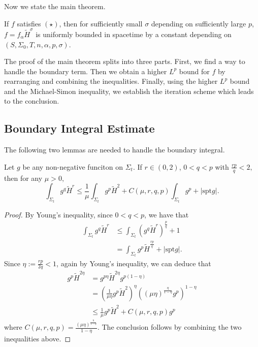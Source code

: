 Now we state the main theorem.

\begin{theorem} \label{stamit}
    If $f$ satisfies $(\star)$, then for sufficiently small $\sigma $ depending on sufficiently large $p$, $f=f_{\alpha }\tilde{H}^{\sigma }$ is uniformly bounded in spacetime by a constant depending on $(S,\Sigma _0,T,n,\alpha ,p,\sigma )$. 
\end{theorem}

The proof of the main theorem splits into three parts. First, we find a way to handle the boundary term. Then we obtain a higher $L^p$ bound for $f$ by rearranging and combining the inequalities. Finally, using the higher $L^p$ bound and the Michael-Simon inequality, we establish the iteration scheme which leads to the conclusion.

\subsection{Boundary Integral Estimate}

The following two lemmas are needed to handle the boundary integral.

\begin{lemma}\label{HSquare}
    Let $g$ be any non-negative funciton on $\Sigma_t.$ If $r \in (0,2)$, $0<q<p$ with $\frac{rp }{q}<2,$ then for any $\mu >0,$ 
    \[
        \int_{\Sigma_t} g^q \tilde{H}^r \leq \frac{1}{\mu }\int_{\Sigma_t} g^p \tilde{H}^2+C(\mu ,r,q,p )\int_{\Sigma_t} g^p + \left| \mathrm{spt } g \right|.    
    \]
\end{lemma}
\begin{proof}
    By Young's inequality, since $0<q<p$, we have that 
    \begin{equation*}
    \begin{split}
        \int_{\Sigma_t} g^q \tilde{H}^r 
    &\leq \int_{\Sigma_t} (g^q \tilde{H}^r)^{\frac{p}{q}}+1  \\
    &= \int_{\Sigma_t} g^p \tilde{H}^{\frac{rp }{q}}+\left| \mathrm{spt } g \right|.
    \end{split}
    \end{equation*} 
    Since $\eta := \frac{rp }{2q}<1$, again by Young's inequality, we can deduce that
    \begin{equation*}
    \begin{split}
        g^p \tilde{H}^{2\eta} 
    &= g^{p \eta }\tilde{H}^{2\eta}g^{p \left( 1-\eta \right) } \\
    &= \left( \frac{1}{\mu \eta  }g^{p}\tilde{H}^2 \right) ^{\eta} \left( (\mu \eta )^{\frac{\eta}{1-\eta } }g^p\right)^{1-\eta }\\
    & \leq \frac{1}{\mu }g^p\tilde{H}^2+C(\mu ,r,q,p)g^p
    \end{split}
    \end{equation*} 
    where $C(\mu ,r,q,p)=\frac{(\mu \eta )^{\frac{\eta}{1-\eta } }}{1-\eta }$.
    The conclusion follows by combining the two inequalities above.
\end{proof}

